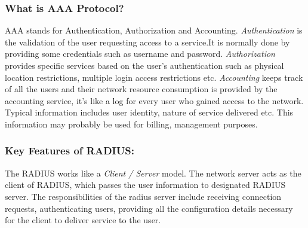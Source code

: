 \subsubsection{What is AAA Protocol? \cite{RADIUS_AAA}} \label{RADIUS_AAA}
AAA stands for Authentication, Authorization and Accounting. \textit{Authentication} is the validation of the user requesting access to a service.It is normally done by providing some credentials such as username and password. \textit{Authorization} provides specific services based on the user’s authentication such as physical location restrictions, multiple login access restrictions etc. \textit{Accounting} keeps track of all the users and their network resource consumption is provided by the accounting service, it’s like a log for every user who gained access to the network. Typical information includes user identity, nature of service delivered etc. This information may probably be used for billing, management purposes.  
%	
\subsubsection{Key Features of RADIUS: \cite{RADIUS_RFC2865}} \label{RADIUS_features}

The RADIUS works like a \textit{Client / Server} model. The network server acts as the client of RADIUS, which passes the user information to designated RADIUS server. The responsibilities of the radius server include receiving connection requests, authenticating users, providing all the configuration details necessary for the client to deliver service to the user.

